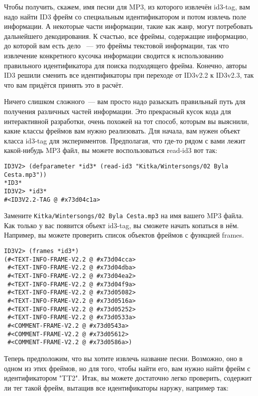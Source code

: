 Чтобы получить, скажем, имя песни для MP3, из которого извлечён id3-tag, вам надо найти
ID3 фрейм со специальным идентификатором и потом извлечь поле информации. А некоторые
части информации, такие как жанр, могут потребовать дальнейшего декодирования. К счастью,
все фреймы, содержащие информацию, до которой вам есть дело ~--- это фреймы текстовой
информации, так что извлечение конкретного кусочка информации сводится к использованию
правильного идентификатора для поиска подходящего фрейма. Конечно, авторы ID3 решили
сменить все идентификаторы при переходе от ID3v2.2 к ID3v2.3, так что вам придётся принять
это в расчёт.

Ничего слишком сложного~--- вам просто надо разыскать правильный путь для получения
различных частей информации. Это прекрасный кусок кода для интерактивной разработки, очень
похожей на тот способ, которым вы выяснили, какие классы фреймов вам нужно
реализовать. Для начала, вам нужен объект класса id3-tag для экспериментов. Предполагая,
что где-то рядом с вами лежит какой-нибудь MP3 файл, вы можете воспользоваться read-id3
вот так:

\begin{lstlisting}
ID3V2> (defparameter *id3* (read-id3 "Kitka/Wintersongs/02 Byla Cesta.mp3"))
*ID3*
ID3V2> *id3*
#<ID3V2.2-TAG @ #x73d04c1a>
\end{lstlisting}

Замените \texttt{Kitka/Wintersongs/02 Byla Cesta.mp3} на имя вашего MP3 файла. Как только
у вас появится объект id3-tag, вы сможете начать копаться в нём. Например, вы можете
проверить список объектов фреймов с функцией frames.

\begin{lstlisting}
ID3V2> (frames *id3*)
(#<TEXT-INFO-FRAME-V2.2 @ #x73d04cca>
 #<TEXT-INFO-FRAME-V2.2 @ #x73d04dba>
 #<TEXT-INFO-FRAME-V2.2 @ #x73d04ea2>
 #<TEXT-INFO-FRAME-V2.2 @ #x73d04f9a>
 #<TEXT-INFO-FRAME-V2.2 @ #x73d05082>
 #<TEXT-INFO-FRAME-V2.2 @ #x73d0516a>
 #<TEXT-INFO-FRAME-V2.2 @ #x73d05252>
 #<TEXT-INFO-FRAME-V2.2 @ #x73d0533a>
 #<COMMENT-FRAME-V2.2 @ #x73d0543a>
 #<COMMENT-FRAME-V2.2 @ #x73d05612>
 #<COMMENT-FRAME-V2.2 @ #x73d0586a>)
\end{lstlisting}

Теперь предположим, что вы хотите извлечь название песни. Возможно, оно в одном из этих
фреймов, но для того, чтобы найти его, вам нужно найти фрейм с идентификатором
"TT2". Итак, вы можете достаточно легко проверить, содержит ли тег такой фрейм, вытащив
все идентификаторы наружу, например так:

